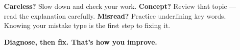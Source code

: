 {\begin{tcolorbox}[
    enhanced,
    colback=funYellowLight,
    colframe=funYellow!60,
    arc=10pt,
    boxrule=1pt,
    left=6mm, right=6mm, top=4mm, bottom=4mm,
]
\vspace{2mm}

\textbf{Careless?} Slow down and check your work. \textbf{Concept?} Review that topic — read the explanation carefully. \textbf{Misread?} Practice underlining key words. Knowing your mistake type is the first step to fixing it.
\end{tcolorbox}

\vspace{4mm}

\begin{center}
{\large\bfseries\color{funGreenDark} \faBrain\hspace{2mm}Diagnose, then fix. That's how you improve.\hspace{2mm}\faBrain}
\end{center}

}
\newpage
